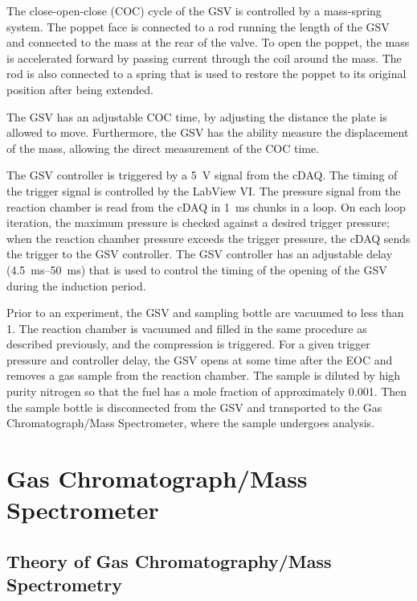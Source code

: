 \documentclass[../main.tex]{subfiles}
\begin{document}
The close-open-close (COC) cycle of the GSV is controlled by a mass-spring
system. The poppet face is connected to a rod running the length of the
GSV and connected to the mass at the rear of the valve. To open the poppet,
the mass is accelerated forward by passing current through the coil around
the mass. The rod is also
connected to a spring that is used to restore the poppet to its original
position after being extended.

The GSV has an adjustable COC time, by adjusting the
distance the plate is allowed to move. Furthermore, the GSV has the ability
measure the displacement of the mass, allowing the direct measurement of
the COC time.

The GSV controller is triggered by a \SI{5}{\volt} signal from the cDAQ.
The timing of the trigger signal is controlled by the LabView VI. The pressure
signal from the reaction chamber is read from the cDAQ in \SI{1}{\milli\second}
chunks in a loop. On each loop iteration, the maximum pressure is checked
against a desired trigger pressure; when the reaction chamber pressure exceeds
the trigger pressure, the cDAQ sends the trigger to the GSV controller. The
GSV controller has an adjustable delay (\SIrange{4.5}{50}{\milli\second}) that
is used to control the timing of the opening of the GSV during the induction period.

Prior to an experiment, the GSV and sampling bottle are vacuumed to less
than \SI{1}{\torr}. The reaction chamber is vacuumed and filled in the same
procedure as described previously, and the compression is triggered. For a given
trigger pressure and controller delay, the GSV opens at some time after the EOC
and removes a gas sample from the reaction chamber. The sample is diluted by
high purity nitrogen so that the fuel has a mole fraction of approximately
\num{0.001}. Then the sample bottle is disconnected from the GSV and transported
to the Gas Chromatograph/Mass Spectrometer, where the sample undergoes analysis.

\section{Gas Chromatograph/Mass Spectrometer}
\label{sec:gcms}

\subsection{Theory of Gas Chromatography/Mass Spectrometry}
\label{sec:gcms-theory}
\end{document}
